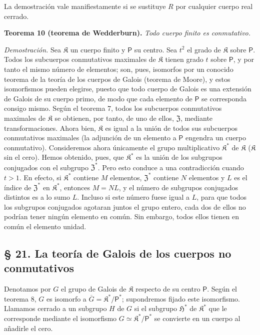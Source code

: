 La demostración vale manifiestamente si se sustituye \(R\) por cualquier cuerpo real cerrado.

\textbf{Teorema 10 (teorema de Wedderburn).} \emph{Todo cuerpo finito es conmutativo.}

\emph{Demostración.} Sea \(\mathfrak K\) un cuerpo finito y \(\mathsf P\) su centro. Sea \(t^2\) el grado de \(\mathfrak K\) sobre \(\mathsf P\). Todos los subcuerpos conmutativos maximales de \(\mathfrak K\) tienen grado \(t\) sobre \(\mathsf P\), y por tanto el mismo número de elementos; son, pues, isomorfos por un conocido teorema de la teoría de los cuerpos de Galois (teorema de Moore), y estos isomorfismos pueden elegirse, puesto que todo cuerpo de Galois es una extensión de Galois de su cuerpo primo, de modo que cada elemento de \(\mathsf P\) se corresponda consigo mismo. Según el teorema 7, todos los subcuerpos conmutativos maximales de \(\mathfrak K\) se obtienen, por tanto, de uno de ellos, \(\mathfrak Z\), mediante transformaciones. Ahora bien, \(\mathfrak K\) es igual a la unión de todos sus subcuerpos conmutativos maximales (la adjunción de un elemento a \(\mathsf P\) engendra un cuerpo conmutativo). Consideremos ahora únicamente el grupo multiplicativo \(\mathfrak K^*\) de \(\mathfrak K\) (\(\mathfrak K\) sin el cero). Hemos obtenido, pues, que \(\mathfrak K^*\) es la unión de los subgrupos conjugados con el subgrupo \(\mathfrak Z^*\). Pero esto conduce a una contradicción cuando \(t>1\). En efecto, si \(\mathfrak K^*\) contiene \(M\) elementos, \(\mathfrak Z^*\) contiene \(N\) elementos y \(L\) es el índice de \(\mathfrak Z^*\) en \(\mathfrak K^*\), entonces \(M=NL\), y el número de subgrupos conjugados distintos es a lo sumo \(L\). Incluso si este número fuese igual a \(L\), para que todos los subgrupos conjugados agotaran juntos el grupo entero, cada dos de ellos no podrían tener ningún elemento en común. Sin embargo, todos ellos tienen en común el elemento unidad.

\subsection*{§ 21. La teoría de Galois de los cuerpos no conmutativos}\label{die-galoissche-theorie-der-nichtkommutativen-koerper}

Denotamos por \(G\) el grupo de Galois de \(\mathfrak K\) respecto de su centro \(\mathsf P\). Según el teorema 8, \(G\) es isomorfo a \(\overline G=\mathfrak K^*/\mathsf P^*\); supondremos fijado este isomorfismo. Llamamos cerrado a un subgrupo \(H\) de \(G\) si el subgrupo \(\mathfrak H^*\) de \(\mathfrak K^*\) que le corresponde mediante el isomorfismo \(G\simeq\mathfrak K^*/\mathsf P^*\) se convierte en un cuerpo al añadirle el cero.

